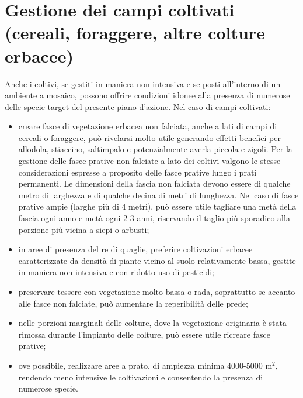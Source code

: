 \documentclass[10pt,twoside,openany,x11names,svgnames,italian,a5paper,dvipsnames,table]{memoir}
\begin{document}
\section[Gestione dei campi coltivati]{Gestione dei campi coltivati (cereali, foraggere, altre colture erbacee)}
Anche i coltivi, se gestiti in maniera non intensiva e se posti all'interno di un ambiente a mosaico, possono offrire condizioni idonee alla presenza di numerose delle specie target del presente piano d'azione.
Nel caso di campi coltivati:
\begin{itemize}\itemsep0pt
  \item creare fasce di vegetazione erbacea non falciata, anche a lati di campi di cereali o foraggere, può rivelarsi molto utile generando effetti benefici per allodola, stiaccino, saltimpalo e potenzialmente averla piccola e zigoli. Per la gestione delle fasce prative non falciate a lato dei coltivi valgono le stesse considerazioni espresse a proposito delle fasce prative lungo i prati permanenti. Le dimensioni della fascia non falciata devono essere di qualche metro di larghezza e di qualche decina di metri di lunghezza. Nel caso di fasce prative ampie (larghe più di 4 metri), può essere utile tagliare una metà della fascia ogni anno e metà ogni 2-3 anni, riservando il taglio più sporadico alla porzione più vicina a siepi o arbusti;
  \item in aree di presenza del re di quaglie, preferire coltivazioni erbacee caratterizzate da densità di piante vicino al suolo relativamente bassa, gestite in maniera non intensiva e con ridotto uso di pesticidi;
  \item preservare tessere con vegetazione molto bassa o rada, soprattutto se accanto alle fasce non falciate, può aumentare la reperibilità delle prede;
  \item nelle porzioni marginali delle colture, dove la vegetazione originaria è stata rimossa durante l'impianto delle colture, può essere utile ricreare fasce prative;
  \item ove possibile, realizzare aree a prato, di ampiezza minima 4000-5000 m$^2$, rendendo meno intensive le coltivazioni e consentendo la presenza di numerose specie.
\end{itemize}
\end{document}

